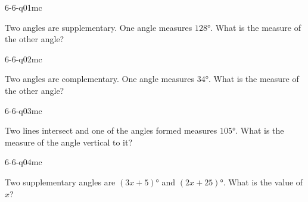 

\begin{practiceQuestion}{6-6-q01}{mc}
\begin{questionText}
Two angles are supplementary. One angle measures $128°$. What is the measure of the other angle?
\end{questionText}
\end{practiceQuestion}

\begin{practiceQuestion}{6-6-q02}{mc}
\begin{questionText}
Two angles are complementary. One angle measures $34°$. What is the measure of the other angle?
\end{questionText}
\end{practiceQuestion}

\begin{practiceQuestion}{6-6-q03}{mc}
\begin{questionText}
Two lines intersect and one of the angles formed measures $105°$. What is the measure of the angle vertical to it?
\end{questionText}
\end{practiceQuestion}

\begin{practiceQuestion}{6-6-q04}{mc}
\begin{questionText}
Two supplementary angles are $(3x + 5)°$ and $(2x + 25)°$. What is the value of $x$?
\end{questionText}
\end{practiceQuestion}

